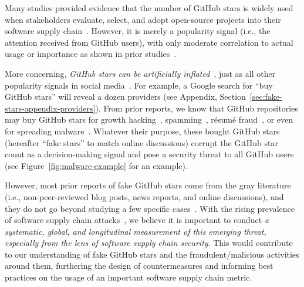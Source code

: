 Many studies provided evidence that the number of GitHub stars is widely used when stakeholders evaluate, select, and adopt open-source projects into their software supply chain~\cite{DBLP:journals/jss/BorgesV18, DBLP:journals/pacmhci/QiuLPSV19, DBLP:conf/sigsoft/VargasATBG20, DBLP:journals/ese/MunaiahKCN17,  DBLP:conf/sp/WermkeWKFAF22, koch2024fault}.
However, it is merely a popularity signal (i.e., the attention received from GitHub users), with only moderate correlation to actual usage or importance as shown in prior studies~\cite{koch2024fault, schueller2024modeling, DBLP:journals/corr/abs-2405-07508}. 

More concerning, \emph{GitHub stars can be artificially inflated}~\cite{wired-news}, just as all other popularity signals in social media~\cite{DBLP:journals/compsec/CatalanPVT23}.
For example, a Google search for ``buy GitHub stars'' will reveal a dozen providers (see Appendix, Section~\ref{sec:fake-stars-appendix-providers}).
From prior reports, we know that GitHub repositories may buy GitHub stars for growth hacking~\cite{oceanbase}, spamming~\cite{dagster}, r\'{e}sum\'{e} fraud~\cite{DBLP:conf/acsac/DuYZDWH0020}, or even for spreading malware~\cite{stargazer-goblin}.
Whatever their purpose, these bought GitHub stars (hereafter ``fake stars'' to match online discussions) corrupt the GitHub star count as a decision-making signal and pose a security threat to all GitHub users (see Figure~\ref{fig:malware-example} for an example).

However, most prior reports of fake GitHub stars come from the gray literature (i.e., non-peer-reviewed blog posts, news reports, and online discussions), and they do not go beyond studying a few specific cases~\cite{dagster, DBLP:conf/acsac/DuYZDWH0020, oceanbase, stargazer-goblin}.
With the rising prevalence of software supply chain attacks~\cite{sonatype-report}, we believe it is important to conduct \emph{a systematic, global, and longitudinal measurement of this emerging threat, especially from the lens of software supply chain security}.
This would contribute to our understanding of fake GitHub stars and the fraudulent/malicious activities around them, furthering the design of countermeasures and informing best practices on the usage of an important software supply chain metric.

